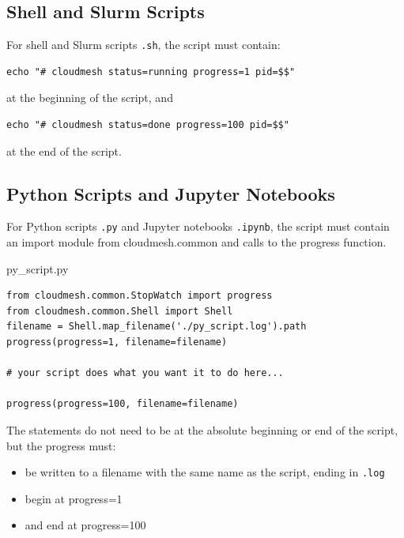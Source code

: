 \subsection{Shell and Slurm Scripts}\label{shell-and-slurm-scripts}

For shell and Slurm scripts \texttt{.sh}, the script must contain:

\begin{verbatim}
echo "# cloudmesh status=running progress=1 pid=$$"
\end{verbatim}

at the beginning of the script, and

\begin{verbatim}
echo "# cloudmesh status=done progress=100 pid=$$"
\end{verbatim}

at the end of the script.

\subsection{Python Scripts and Jupyter
Notebooks}\label{python-scripts-and-jupyter-notebooks}

For Python scripts \texttt{.py} and Jupyter notebooks \texttt{.ipynb},
the script must contain an import module from cloudmesh.common and calls
to the progress function.

py\_script.py

\begin{verbatim}
from cloudmesh.common.StopWatch import progress
from cloudmesh.common.Shell import Shell
filename = Shell.map_filename('./py_script.log').path
progress(progress=1, filename=filename)

# your script does what you want it to do here...

progress(progress=100, filename=filename)
\end{verbatim}

The statements do not need to be at the absolute beginning or end of the
script, but the progress must:

\begin{itemize}
\item
  be written to a filename with the same name as the script, ending in
  \texttt{.log}
\item
  begin at progress=1
\item
  and end at progress=100
\end{itemize}
